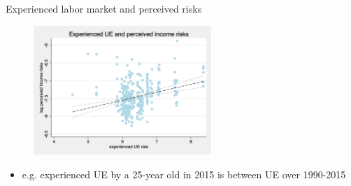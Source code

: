 \documentclass{beamer}
\begin{document}
\begin{frame}{Experienced labor market and perceived risks}
	\begin{figure}
		\centering 
		\label{experience_ue_var}
		\includegraphics[width=0.6\textwidth]{figures/experience_ue_var_data.png}
	\end{figure}
	\begin{itemize}
		\item e.g. experienced UE by a 25-year old in 2015 is between UE over 1990-2015
		
	\end{itemize}
\end{frame}
\end{document}
